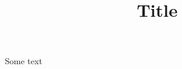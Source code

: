 \documentclass[man,12pt,a4paper,noextraspace,floatsintext,biblatex]{apa7}
\title{Title}
\begin{document}
\maketitle

\tableofcontets

Some text
\end{document}
